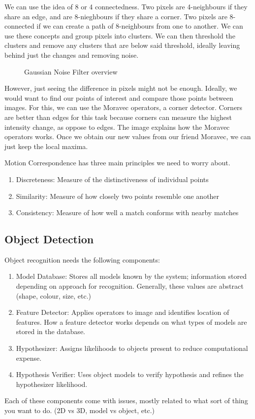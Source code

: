We can use the idea of 8 or 4 connectedness. Two pixels are 4-neighbours if they share an edge, and are 8-nieghbours if they share a corner. Two pixels are 8-connected if we can create a path of 8-neighbours from one to another. We can use these concepts and group pixels into clusters. We can then threshold the clusters and remove any clusters that are below said threshold, ideally leaving behind just the changes and removing noise.
\begin{figure}[!htb]
	\caption{\label{fig:moravec}Gaussian Noise Filter overview}
\end{figure}
However, just seeing the difference in pixels might not be enough. Ideally, we would want to find our points of interest and compare those points between images. For this, we can use the Moravec operators, a corner detector. Corners are better than edges for this task because corners can measure the highest intensity change, as oppose to edges. The image explains how the Moravec operators works. Once we obtain our new values from our friend Moravec, we can just keep the local maxima.\newline

Motion Correspondence has three main principles we need to worry about.
\begin{enumerate}
	\item Discreteness: Measure of the distinctiveness of individual points
	\item Similarity: Measure of how closely two points resemble one another
	\item Consistency: Measure of how well a match conforms with nearby matches
\end{enumerate}
\subsection{Object Detection}
Object recognition needs the following components:
\begin{enumerate}
	\item Model Database: Stores all models known by the system; information stored depending on approach for recognition. Generally, these values are abstract (shape, colour, size, etc.)
	\item Feature Detector: Applies operators to image and identifies location of features. How a feature detector works depends on what types of models are stored in the database.
	\item Hypothesizer: Assigns likelihoods to objects present to reduce computational expense.
	\item Hypothesis Verifier: Uses object models to verify hypothesis and refines the hypothesizer likelihood. 
\end{enumerate}
Each of these components come with issues, mostly related to what sort of thing you want to do. (2D vs 3D, model vs object, etc.)